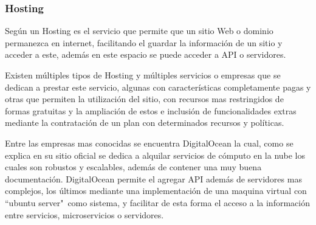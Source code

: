 \subsubsection{Hosting}
Según \textcite{Hosting} un Hosting es el servicio que permite que un sitio
Web o dominio permanezca en internet, facilitando el guardar la información de un sitio
y acceder a este, además en este espacio se puede acceder a API o servidores.

Existen múltiples tipos de Hosting y múltiples servicios o empresas que se
dedican a prestar este servicio, algunas con características completamente pagas
y otras que permiten la utilización del sitio, con recursos mas restringidos de
formas gratuitas y la ampliación de estos e inclusión de funcionalidades extras
mediante la contratación de un plan con determinados recursos y políticas.

Entre las empresas mas conocidas se encuentra DigitalOcean  la cual, como se
explica en su sitio oficial \textcite{DigitalOcean} se dedica a alquilar servicios
de cómputo en la nube los cuales son robustos y escalables, además de contener
una muy buena documentación. DigitalOcean permite el agregar API además de
servidores mas complejos, los últimos mediante una implementación de una maquina
virtual con ``ubuntu server"\ como sistema, y facilitar de esta forma el acceso
a la información entre servicios, microservicios o servidores.
